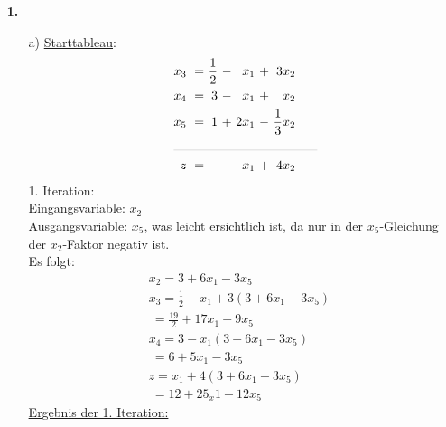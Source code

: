 \documentclass [a4paper,11pt]{article}
\author{\authorinfotitle}
\title{\titleinfo}
\date{\today}
\begin{document}
\maketitle
    \begin{enumerate}
        \item[\textbf{1.}]
        \begin{enumerate}
            \item[a)]
                \underline{Starttableau}:
                \begin{align*}
                \begin{alignedat}{6}
                && x_3 &\ = &\ \frac{1}{2} &\ - &\  x_1 &\ + &\           3x_2 \\
                && x_4 &\ = &\           3 &\ - &\  x_1 &\ + &\            x_2 \\
                && x_5 &\ = &\           1 &\ + &\ 2x_1 &\ - &\ \frac{1}{3}x_2 \\
                &\rlap{\rule{4cm}{.1pt}} &&&&&&&\\
                && z   &\ = &              &    &\  x_1 &\ + &\  4x_2
                \end{alignedat}
                \end{align*}
                1. Iteration:\\
                Eingangsvariable: $x_2$\\
                Ausgangsvariable: $x_5$, was leicht ersichtlich ist, da nur in der $x_5$-Gleichung der $x_2$-Faktor negativ ist.\\
                Es folgt:
                \begin{align*}
                    & x_2 = 3 + 6x_1 - 3x_5\\
                    & x_3 = \frac{1}{2} - x_1 + 3 \left( 3 + 6x_1 - 3x_5 \right)\\
                    &   \ = \frac{19}{2} +17x_1 - 9x_5\\
                    & x_4 = 3 - x_1 \left( 3 + 6x_1 - 3x_5 \right)\\
                    &   \ = 6 + 5x_1 - 3x_5\\
                    &   z = x_1 + 4 \left( 3 + 6x_1 - 3x_5 \right)\\
                    &   \ = 12 + 25_x1 - 12x_5
                \end{align*}
                \underline{Ergebnis der 1. Iteration:}
                \begin{align*}
                \begin{alignedat}{6}

\end{alignedat}
\end{align*}
\end{enumerate}
\end{enumerate}
\end{document}
